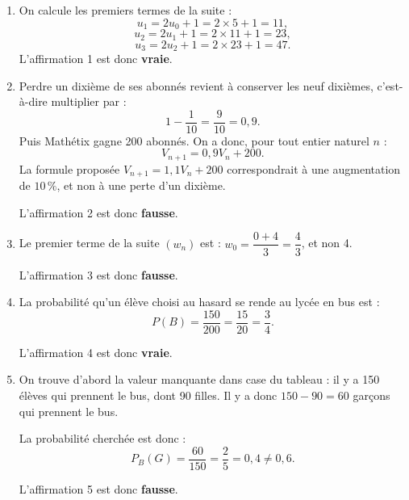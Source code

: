 \begin{enumerate}
\item On calcule les premiers termes de la suite :
\[
u_1=2u_0+1=2\times 5+1=11,
\]
\[
u_2=2u_1+1=2\times 11+1=23,
\]
\[
u_3=2u_2+1=2\times 23+1=47.
\]
L'affirmation 1 est donc \textbf{vraie}.

\bigskip

\item Perdre un dixième de ses abonnés revient à conserver les neuf dixièmes, c'est-à-dire multiplier par :
\[
1-\dfrac{1}{10}=\dfrac{9}{10}=0{,}9.
\]
Puis Mathétix gagne 200 abonnés. On a donc, pour tout entier naturel $n$ :
\[
V_{n+1}=0{,}9V_n+200.
\]
La formule proposée $V_{n+1}=1{,}1V_n+200$ correspondrait à une augmentation de $10\,\%$, et non à une perte d'un dixième.

L'affirmation 2 est donc \textbf{fausse}.

\bigskip

\item Le premier terme de la suite $(w_n)$ est : $w_0=\dfrac{0+4}{3}=\dfrac{4}{3}$, et non 4.

L'affirmation 3 est donc \textbf{fausse}.

\bigskip

\item La probabilité qu'un élève choisi au hasard se rende au lycée en bus est :
\[P(B)=\dfrac{150}{200}=\dfrac{15}{20}=\dfrac{3}{4}.\]

L'affirmation 4 est donc \textbf{vraie}.

\bigskip

\item On trouve d'abord la valeur manquante dans case du tableau : il y a 150 élèves qui prennent le bus, dont 90 filles. Il y a donc $150-90=60$ garçons qui prennent le bus.

La probabilité cherchée est donc :
\[P_B(G)=\dfrac{60}{150}=\dfrac{2}{5}=0{,}4\neq0{,}6.\]

L'affirmation 5 est donc \textbf{fausse}.
\end{enumerate}
